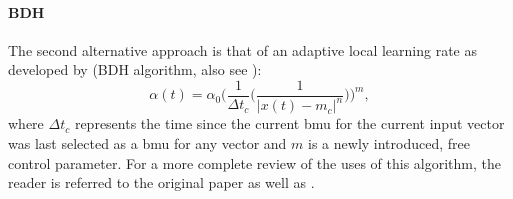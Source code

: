 \paragraph{BDH}
\label{para:alpha_bdh}
The second alternative approach is that of an adaptive local learning rate as
developed by \citet{bauer1996} (BDH algorithm, also see \citet{merenyi2007}):
\begin{equation}
  \alpha(t) = \alpha_0 \bigg(\frac{1}{\Delta{t_c}}\bigg(\frac{1}{|x(t)-m_c|^n}\bigg)\bigg)^m,
\end{equation}
where $\Delta{t_c}$ represents the time since the current \gls{bmu} for the
current input vector was last selected as a \gls{bmu} for any vector and $m$ is
a newly introduced, free control parameter. For a more complete review of the
uses of this algorithm, the reader is referred to the original paper
\citep{bauer1996} as well as \citet{merenyi2007}.
